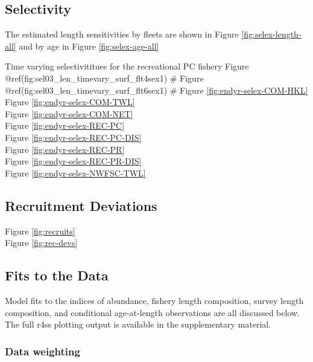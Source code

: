 \documentclass[
  english,
  a4paper,
]{article}
\begin{document}
\vspace{0.5cm}

\hypertarget{selectivity}{%
\subsection{Selectivity}\label{selectivity}}

The estimated length sensitivities by fleets are shown in Figure \ref{fig:selex-length-all}
and by age in Figure \ref{fig:selex-age-all}

Time varying selectivititues for the recreational PC fishery
Figure @ref(fig:sel03\_len\_timevary\_surf\_flt4sex1) \#
Figure @ref(fig:sel03\_len\_timevary\_surf\_flt6sex1) \#
Figure \ref{fig:endyr-selex-COM-HKL}\\
Figure \ref{fig:endyr-selex-COM-TWL}\\
Figure \ref{fig:endyr-selex-COM-NET}\\
Figure \ref{fig:endyr-selex-REC-PC}\\
Figure \ref{fig:endyr-selex-REC-PC-DIS}\\
Figure \ref{fig:endyr-selex-REC-PR}\\
Figure \ref{fig:endyr-selex-REC-PR-DIS}\\
Figure \ref{fig:endyr-selex-NWFSC-TWL}

\hypertarget{recruitment-deviations}{%
\subsection{Recruitment Deviations}\label{recruitment-deviations}}

Figure \ref{fig:recruits}\\
Figure \ref{fig:rec-devs}

\hypertarget{fits-to-the-data}{%
\subsection{Fits to the Data}\label{fits-to-the-data}}

Model fits to the indices of abundance, fishery length composition, survey length
composition, and conditional age-at-length observations are all discussed below.
The full r4ss plotting output is available in the supplementary material.

\hypertarget{data-weighting-1}{%
\subsubsection{Data weighting}\label{data-weighting-1}}
\end{document}

